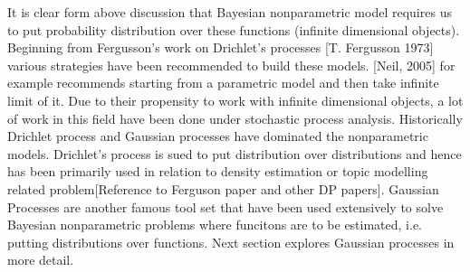 It is clear form above discussion that Bayesian nonparametric model requires us to put probability distribution over these functions (infinite dimensional objects). Beginning from Fergusson’s work on Drichlet’s processes [T. Fergusson 1973] various strategies have been recommended to build these models. [Neil, 2005] for example recommends starting from a parametric model and then take infinite limit of it. Due to their propensity to work with infinite dimensional objects, a lot of work in this field have been done under stochastic process analysis. Historically Drichlet process  and Gaussian processes have dominated the nonparametric models. Drichlet’s process is sued to put distribution over distributions and hence has been primarily used in relation to density estimation or topic modelling related problem[Reference to Ferguson paper and other DP papers]. Gaussian Processes are another famous tool set that have been used extensively to solve Bayesian nonparametric problems where funcitons are to be estimated, i.e. putting distributions over functions. Next section explores Gaussian processes in more detail.







